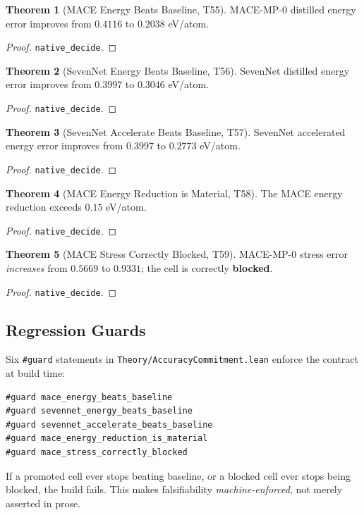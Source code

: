 \documentclass[11pt,a4paper]{article}
\theoremstyle{definition}
\newtheorem{theorem}{Theorem}[section]
\theoremstyle{plain}
\begin{document}
\begin{theorem}[MACE Energy Beats Baseline, T55]
\label{thm:mace}
MACE-MP-0 distilled energy error improves from $0.4116$ to $0.2038$ eV/atom.
\end{theorem}
\begin{proof}
\texttt{native\_decide}.
\end{proof}

\begin{theorem}[SevenNet Energy Beats Baseline, T56]
\label{thm:sevennet}
SevenNet distilled energy error improves from $0.3997$ to $0.3046$ eV/atom.
\end{theorem}
\begin{proof}
\texttt{native\_decide}.
\end{proof}

\begin{theorem}[SevenNet Accelerate Beats Baseline, T57]
\label{thm:sevennetacc}
SevenNet accelerated energy error improves from $0.3997$ to $0.2773$ eV/atom.
\end{theorem}
\begin{proof}
\texttt{native\_decide}.
\end{proof}

\begin{theorem}[MACE Energy Reduction is Material, T58]
\label{thm:material}
The MACE energy reduction exceeds $0.15$ eV/atom.
\end{theorem}
\begin{proof}
\texttt{native\_decide}.
\end{proof}

\begin{theorem}[MACE Stress Correctly Blocked, T59]
\label{thm:blocked}
MACE-MP-0 stress error \emph{increases} from $0.5669$ to $0.9331$; the cell is correctly \textbf{blocked}.
\end{theorem}
\begin{proof}
\texttt{native\_decide}.
\end{proof}

\subsection{Regression Guards}
\label{subsec:guards}

Six \texttt{\#guard} statements in \texttt{Theory/AccuracyCommitment.lean} enforce the contract at build time:
\begin{verbatim}
#guard mace_energy_beats_baseline
#guard sevennet_energy_beats_baseline
#guard sevennet_accelerate_beats_baseline
#guard mace_energy_reduction_is_material
#guard mace_stress_correctly_blocked
\end{verbatim}
If a promoted cell ever stops beating baseline, or a blocked cell ever stops being blocked, the build fails. This makes falsifiability \emph{machine-enforced}, not merely asserted in prose.
\end{document}
